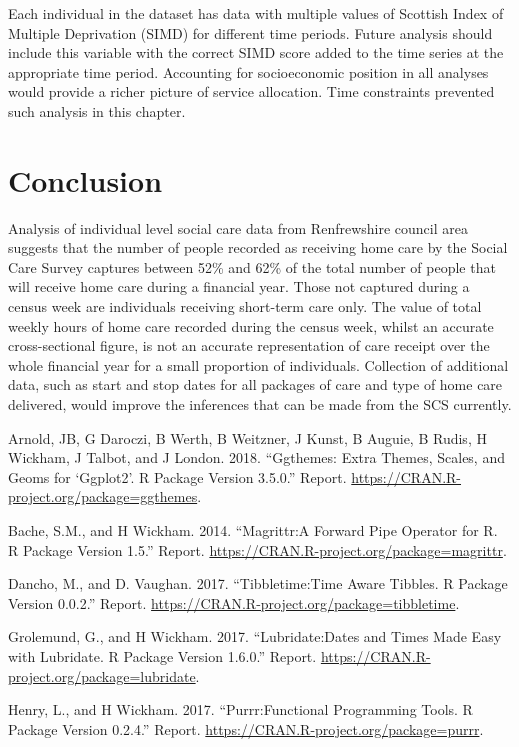 \documentclass[]{article}
\begin{document}
Each individual in the dataset has data with multiple values of Scottish
Index of Multiple Deprivation (SIMD) for different time periods. Future
analysis should include this variable with the correct SIMD score added
to the time series at the appropriate time period. Accounting for
socioeconomic position in all analyses would provide a richer picture of
service allocation. Time constraints prevented such analysis in this
chapter.

\section{Conclusion}\label{sec:renf-conc}

Analysis of individual level social care data from Renfrewshire council
area suggests that the number of people recorded as receiving home care
by the Social Care Survey captures between 52\% and 62\% of the total
number of people that will receive home care during a financial year.
Those not captured during a census week are individuals receiving
short-term care only. The value of total weekly hours of home care
recorded during the census week, whilst an accurate cross-sectional
figure, is not an accurate representation of care receipt over the whole
financial year for a small proportion of individuals. Collection of
additional data, such as start and stop dates for all packages of care
and type of home care delivered, would improve the inferences that can
be made from the SCS currently.

\hypertarget{refs}{}
\hypertarget{ref-RN527}{}
Arnold, JB, G Daroczi, B Werth, B Weitzner, J Kunst, B Auguie, B Rudis,
H Wickham, J Talbot, and J London. 2018. ``Ggthemes: Extra Themes,
Scales, and Geoms for `Ggplot2'. R Package Version 3.5.0.'' Report.
\url{https://CRAN.R-project.org/package=ggthemes}.

\hypertarget{ref-RN526}{}
Bache, S.M., and H Wickham. 2014. ``Magrittr:A Forward Pipe Operator for
R. R Package Version 1.5.'' Report.
\url{https://CRAN.R-project.org/package=magrittr}.

\hypertarget{ref-RN356}{}
Dancho, M., and D. Vaughan. 2017. ``Tibbletime:Time Aware Tibbles. R
Package Version 0.0.2.'' Report.
\url{https://CRAN.R-project.org/package=tibbletime}.

\hypertarget{ref-RN522}{}
Grolemund, G., and H Wickham. 2017. ``Lubridate:Dates and Times Made
Easy with Lubridate. R Package Version 1.6.0.'' Report.
\url{https://CRAN.R-project.org/package=lubridate}.

\hypertarget{ref-RN523}{}
Henry, L., and H Wickham. 2017. ``Purrr:Functional Programming Tools. R
Package Version 0.2.4.'' Report.
\url{https://CRAN.R-project.org/package=purrr}.
\end{document}
